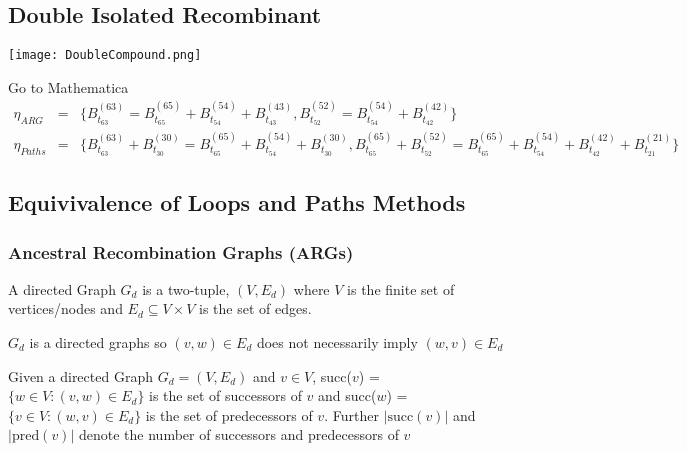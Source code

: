 \subsection*{Double Isolated Recombinant}
\begin{center}
\texttt{[image: DoubleCompound.png]} 
\end{center}
Go to Mathematica
\begin{eqnarray*}
\eta_{ARG} &=& \{ B_{t_{63}}^{(63)} = B_{t_{65}}^{(65)} + B_{t_{54}}^{(54)} + B_{t_{43}}^{(43)}, B_{t_{52}}^{(52)} = B_{t_{54}}^{(54)} + B_{t_{42}}^{(42)}  \} \\
\eta_{Paths} &=& \{ B_{t_{63}}^{(63)} + B_{t_{30}}^{(30)} = B_{t_{65}}^{(65)} + B_{t_{54}}^{(54)} + B_{t_{30}}^{(30)}, B_{t_{65}}^{(65)} + B_{t_{52}}^{(52)} = B_{t_{65}}^{(65)} + B_{t_{54}}^{(54)} + B_{t_{42}}^{(42)} + B_{t_{21}}^{(21)} \} 
\end{eqnarray*}


\subsection{Equivivalence of Loops and Paths Methods}
\subsubsection{Ancestral Recombination Graphs (ARGs)}
\begin{definition} \label{def:dgraphs} A directed Graph $G_d$ is a two-tuple, $(V,E_d)$ where $V$ is the finite set of vertices/nodes and $E_d \subseteq V \times V$ is the set of edges. 
\end{definition}
\begin{note}
$G_d$ is a directed graphs so $(v,w) \in E_d$ does not necessarily imply $(w,v) \in E_d$
\end{note}

\begin{definition} Given a directed Graph $G_d = (V,E_d)$ and $v \in V$, succ($v$) = $\{ w \in V : (v,w) \in E_d \}$ is the set of successors of $v$ and succ($w$) = $\{ v \in V : (w,v) \in E_d \}$ is the set of predecessors of $v$. Further $|\text{succ}(v)| $ and $|\text{pred}(v)|$ denote the number of successors and predecessors of $v$
\end{definition}

